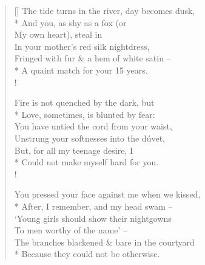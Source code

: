 \settowidth{\versewidth}{The tide turns in the river, day becomes dusk,}
\begin{verse}[\versewidth]
The tide turns in the river, day becomes dusk,\\*
\vin And you, as shy as a fox (or\\
My own heart), steal in\\
\vin In your mother's red silk nightdress,\\
Fringed with fur \& a hem of white satin --\\*
\vin A quaint match for your 15 years.\\!

Fire is not quenched by the dark, but\\*
\vin Love, sometimes, is blunted by fear:\\
You have untied the cord from your waist,\\
\vin Unstrung your softnesses into the d\'uvet,\\
But, for all my teenage desire, I\\*
\vin Could not make myself hard for you.\\!

You pressed your face against me when we kissed,\\*
\vin After, I remember, and my head swam --\\
`Young girls should show their nightgowns\\
\vin To men worthy of the name' --\\
The branches blackened \& bare in the courtyard\\*
\vin Because they could not be otherwise.
\end{verse}
